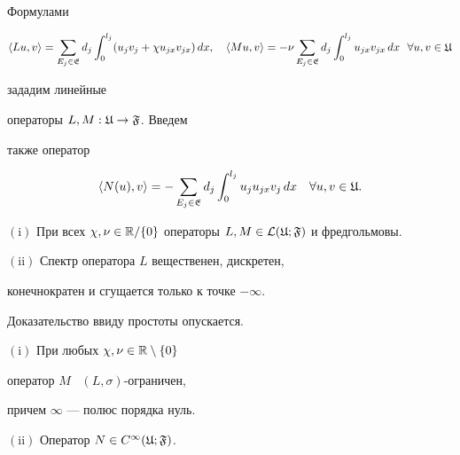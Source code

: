 Формулами


$$


\langle Lu, v \rangle=\sum_{E_j \in


\frak{E}}d_j\int_0^{l_j} (u_j v_j+\chi u_{jx}


v_{jx})\,dx,\quad


\langle Mu, v \rangle=-\nu\sum_{E_j \in \frak{E}}d_j\int_0^{l_j} u_{jx}


v_{jx}\,dx \ \ \forall u,v \in \frak{U}


$$


зададим линейные


операторы $L, M:\frak{U} \rightarrow \frak{F}$. Введем


также оператор


$$


\langle N(u), v \rangle=-\sum_{E_j \in \frak{E}}d_j


\int_0^{l_j} u_j u_{jx}


v_j \,dx \quad \forall u,v \in \frak{U}.


$$








\begin{lems}


$\mathrm{(i)}$ При всех $\chi, \nu \in \Bbb{R}/\{0\}$ операторы $L, M


\in\cal{L}(\frak{U};\frak{F})$ и фредгольмовы.





$\mathrm{(ii)}$ Спектр оператора $L$ вещественен, дискретен, 


конечнократен и сгущается только к точке $-\infty$.


\end{lems}





Доказательство ввиду простоты опускается.








\begin{lems}


$\mathrm{(i)}$ При любых $\chi, \nu \in \Bbb{R}\setminus\{0\}$ 


оператор $M$ \ $(L,\sigma)$-ограничен,


причем $\infty$ --- полюс порядка нуль.





$\mathrm{(ii)}$ Оператор $N \in C^{\infty}(\frak{U}; \frak{F})$.


\end{lems}








